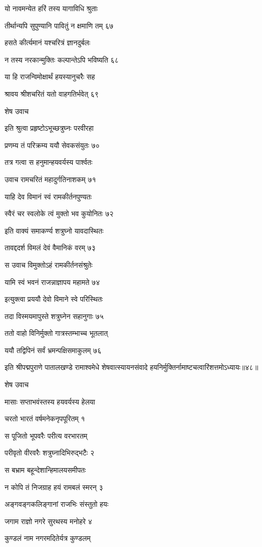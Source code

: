 यो नावमन्येत हरिं तस्य यागाविधि श्रुताः

तीर्थान्यपि सुपुण्यानि पावितुं न क्षमाणि तम् ६७

हसते कीर्त्यमानं यश्चरित्रं ज्ञानदुर्बलः

न तस्य नरकान्मुक्तिः कल्पान्तेऽपि भविष्यति ६८

या हि राजन्विमोक्षार्थं हयस्यानुचरैः सह

श्रावय श्रीशचरितं यतो वाहगतिर्भवेत् ६९

शेष उवाच

इति श्रुत्वा प्रहृष्टोऽभूच्छत्रुघ्नः परवीरहा

प्रणम्य तं परिक्रम्य ययौ सेवकसंयुतः ७०

तत्र गत्वा स हनुमान्हयवर्यस्य पार्श्वतः

उवाच रामचरितं महादुर्गतिनाशकम् ७१

याहि देव विमानं स्वं रामकीर्तनपुण्यतः

स्वैरं चर स्वलोके त्वं मुक्तो भव कुयोनितः ७२

इति वाक्यं समाकर्ण्य शत्रुघ्नो यावदास्थितः

तावद्ददर्श विमलं देवं वैमानिकं वरम् ७३

स उवाच विमुक्तोऽहं रामकीर्तनसंश्रुतेः

यामि स्वं भवनं राजन्नाज्ञापय महामते ७४

इत्युक्त्वा प्रययौ देवो विमाने स्वे परिस्थितः

तदा विस्मयमापुस्ते शत्रुघ्नेन सहानुगाः ७५

ततो वाहो विनिर्मुक्तो गात्रस्तम्भाच्च भूतलात्

ययौ तद्विपिनं सर्वं भ्रमन्पक्षिसमाकुलम् ७६

इति श्रीपद्मपुराणे पातालखण्डे रामाश्वमेधे शेषवात्स्यायनसंवादे हयनिर्मुक्तिर्नामाष्टचत्वारिंशत्तमोऽध्यायः॥४८॥


शेष उवाच

मासाः सप्ताभवंस्तस्य हयवर्यस्य हेलया

चरतो भारतं वर्षमनेकनृपपूरितम् १

स पूजितो भूपवरैः परीत्य वरभारतम्

परीवृतो वीरवरैः शत्रुघ्नादिभिरुद्भटैः २

स बभ्राम बहून्देशान्हिमालयसमीपतः

न कोपि तं निजग्राह हयं रामबलं स्मरन् ३

अङ्गवङ्गकलिङ्गानां राजभिः संस्तुतो हयः

जगाम राज्ञो नगरे सुरथस्य मनोहरे ४

कुण्डलं नाम नगरमदितेर्यत्र कुण्डलम्

